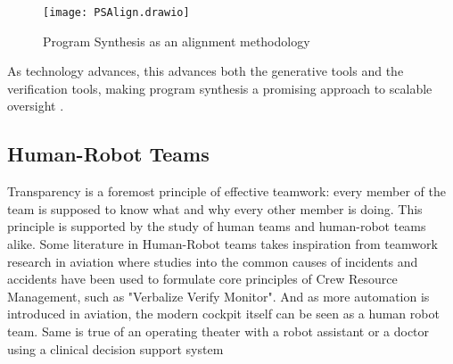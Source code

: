 \begin{figure}
    \centering
    \texttt{[image: PSAlign.drawio]}
    \caption{Program Synthesis as an alignment methodology}
    \label{fig:ps-as-alignment}
\end{figure}

As technology advances, this advances both the generative tools and the verification tools, making program synthesis a promising approach to scalable oversight \cite[sec. 5]{amodeiConcreteProblemsAI2016}.

\subsection{Human-Robot Teams}

Transparency is a foremost principle of effective teamwork: every member of the team is supposed to know what and why every other member is doing. 
This principle is supported by the study of human teams \cite{bagPeerTransparencyTeams2012, solomonInferenceTransparencyEffective2021} and human-robot teams \cite{ezenyilimbaImpactTransparencyExplanations2022, guznovRobotTransparencyTeam2019, holderDesigningBiDirectionalTransparency2021, lakhmaniExploringEffectCommunication2019, lakhmaniProposedApproachDetermining2016, mercadoIntelligentAgentTransparency2016, ososkyDeterminantsSystemTransparency2014, panganibanTransparencyAutonomousTeammates2020, ronconeTransparentRoleAssignment2017} alike.
Some literature in Human-Robot teams takes inspiration \cite{shivelyCrewResourceManagement2018} from teamwork research in aviation where studies into the common causes of incidents and accidents \cite{chidesterPersonalityFactorsFlight1990, chidesterPilotPersonalityCrew1991, smithSimulatorStudyInteraction1979} have been used to formulate core principles of Crew Resource Management, such as "Verbalize Verify Monitor".
And as more automation is introduced in aviation, the modern cockpit itself can be seen as a human robot team.
Same is true of an operating theater with a robot assistant \cite{weerarathnaHumanRobotCollaborationHealthcare2023} or a doctor using a clinical decision support system \cite{castilloConsiderationsSuccessfulClinical2013, mooreIntroductionClinicalDecision2011, osullivanDecisionTimeClinical2014, purcellWhatMakesGood2005, sakallarisClinicalDecisionSupport2000, selfClinicalDecisionSupport2008, stangeThisIssueClinical2011, wrightClinicalDecisionSupport2009}

